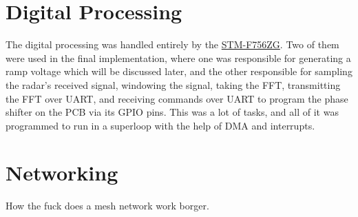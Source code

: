 \section{Digital Processing}
The digital processing was handled entirely by the \href{https://www.st.com/en/evaluation-tools/nucleo-f756zg.html}{STM-F756ZG}.
Two of them were used in the final implementation, where one was responsible for generating a ramp voltage which will be discussed
later, and the other responsible for sampling the radar's received signal, windowing the signal, taking the FFT, transmitting 
the FFT over UART, and receiving commands over UART to program the phase shifter on the PCB via its GPIO pins. This was a lot of tasks,
and all of it was programmed to run in a superloop with the help of DMA and interrupts.

\section{Networking}
How the fuck does a mesh network work borger.



